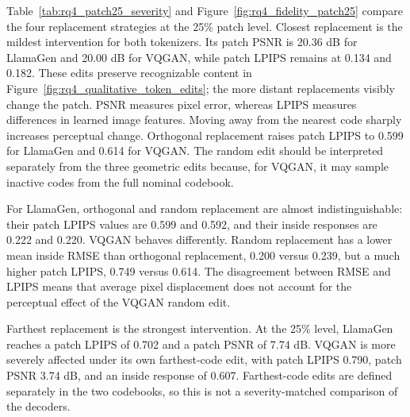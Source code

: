 Table~\ref{tab:rq4_patch25_severity} and
Figure~\ref{fig:rq4_fidelity_patch25} compare the four replacement strategies
at the 25\% patch level. Closest replacement is the mildest
intervention for both tokenizers. Its patch PSNR is 20.36 dB for LlamaGen and
20.00 dB for VQGAN, while patch LPIPS remains at 0.134 and 0.182. These edits preserve recognizable
content in Figure~\ref{fig:rq4_qualitative_token_edits}; the more distant
replacements visibly change the patch. PSNR measures pixel error, whereas
LPIPS measures differences in learned image features. Moving away
from the nearest code sharply increases perceptual change. Orthogonal
replacement raises patch LPIPS to 0.599 for LlamaGen and 0.614 for VQGAN.
The random edit should be interpreted separately from the three geometric
edits because, for VQGAN, it may sample inactive codes from the full nominal
codebook.

For LlamaGen, orthogonal and random replacement are almost indistinguishable:
their patch LPIPS values are 0.599 and 0.592, and their inside responses are
0.222 and 0.220. VQGAN behaves differently. Random replacement has a lower
mean inside RMSE than orthogonal replacement, 0.200 versus 0.239, but a much
higher patch LPIPS, 0.749 versus 0.614. The disagreement between RMSE and LPIPS
means that average pixel displacement does not account for the perceptual
effect of the VQGAN random edit.

Farthest replacement is the strongest intervention. At the 25\% level,
LlamaGen reaches a patch LPIPS of 0.702 and a patch PSNR of 7.74 dB. VQGAN is
more severely affected under its own farthest-code edit, with patch LPIPS
0.790, patch PSNR 3.74 dB, and an inside response of 0.607. Farthest-code
edits are defined separately in the two codebooks, so this is not a
severity-matched comparison of the decoders.

